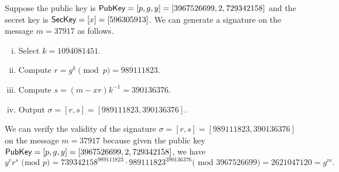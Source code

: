 \begin{exmp}
    Suppose the public key is ${\sf PubKey} = [p, g, y] = [3967526699, 2, 729342158]$ 
    and the secret key is ${\sf SecKey} = [x] = [596305913]$. We can generate a 
    signature on the message $m = 37917$ as follows. 
    \begin{enumerate}[(i)]
        \item Select $k = 1094081451$. 
        \item Compute $r = g^k \pmod p = 989111823$. 
        \item Compute $s = (m - xr)k^{-1} = 390136376$. 
        \item Output $\sigma = [r, s] = [989111823, 390136376]$. 
    \end{enumerate}
    We can verify the validity of the signature $\sigma = [r, s] 
    = [989111823, 390136376]$ on the message $m = 37917$ because given the 
    public key ${\sf PubKey} = [p, g, y] = [3967526699, 2, 729342158]$, we have 
    \[ y^r r^s \text{ (mod $p$)} = 739342158^{989111823} \cdot 989111823^{390136376}
    \text{( mod $3967526699$)} = 2621047120 = g^m. \] 
\end{exmp}

